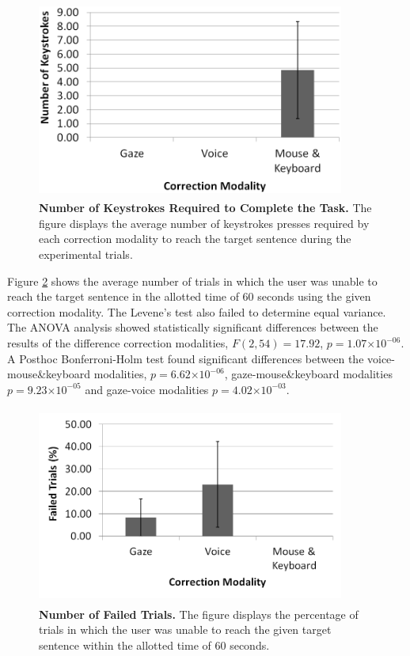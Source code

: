 \documentclass[]{article}
\providecommand{\e}[1]{\ensuremath{\times 10^{#1}}}
\begin{document}
\begin{figure}[!ht]
\begin{center}
\vspace{-3mm}
\includegraphics[width=0.9\textwidth,height=65mm]{figures/keystrokes.png}
\end{center}
\caption{\textbf{Number of Keystrokes Required to Complete the Task.} The figure displays the average number of
keystrokes presses required by each correction modality to reach the target sentence
during the experimental trials.}
\label{keystrokes}
\end{figure}


Figure \ref{failFig} shows the average number of trials in which the user was unable to reach the target sentence in the
allotted time of 60 seconds using the given correction modality. The Levene's test also failed to determine equal
variance. The ANOVA analysis showed statistically significant differences between the results of the
difference correction modalities, $F(2,54)=17.92$, $p=1.07\e{-06}$.   A Posthoc Bonferroni-Holm test found
significant differences between the voice-mouse\&keyboard modalities, $p=6.62\e{-06}$, gaze-mouse\&keyboard modalities
$p=9.23\e{-05}$ and gaze-voice modalities $p=4.02\e{-03}$.


\begin{figure}[!ht]
\begin{center}
\vspace{-3mm}
\includegraphics[width=0.9\textwidth,height=65mm]{figures/fail.png}
\end{center}
\caption{\textbf{Number of Failed Trials.} The figure displays the percentage of trials in which the user
was unable to reach the given target sentence within the allotted time of 60 seconds.}
\label{failFig}
\end{figure}
\end{document}
